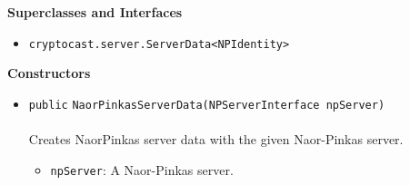 \textbf{\sffamily Superclasses and Interfaces}
\begin{itemize}
\item \lstinline|cryptocast.server.ServerData<NPIdentity>|
\end{itemize}


\textbf{\sffamily Constructors}
\begin{itemize}
\item \lstinline|public| \lstinline|NaorPinkasServerData|\lstinline|(NPServerInterface npServer)|\\ \\[-0.6em]
Creates NaorPinkas server data with the given Naor-Pinkas server.
\begin{itemize}
\item \lstinline|npServer|: A Naor-Pinkas server.
\end{itemize}



\end{itemize}


